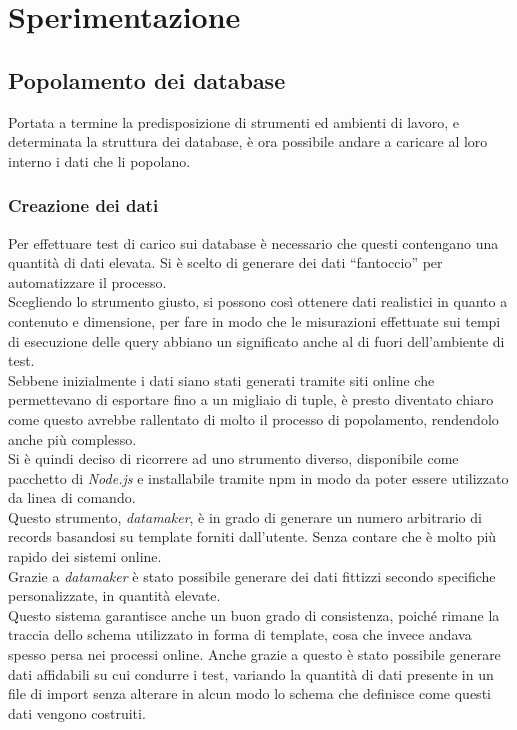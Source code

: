 
\chapter{Sperimentazione}
\label{cap:sperimentazione}
\section{Popolamento dei database}

Portata a termine la predisposizione di strumenti ed ambienti di lavoro, e determinata la struttura dei database, è ora possibile andare a caricare al loro interno i dati che li popolano.\\

\subsection{Creazione dei dati}
Per effettuare test di carico sui database è necessario che questi contengano una quantità di dati elevata. Si è scelto di generare dei dati ``fantoccio'' per automatizzare il processo.\\
Scegliendo lo strumento giusto, si possono così ottenere dati realistici in quanto a contenuto e dimensione, per fare in modo che le misurazioni effettuate sui tempi di esecuzione delle query abbiano un significato anche al di fuori dell'ambiente di test.\\
Sebbene inizialmente i dati siano stati generati tramite siti online che permettevano di esportare fino a un migliaio di tuple, è presto diventato chiaro come questo avrebbe rallentato di molto il processo di popolamento, rendendolo anche più complesso.\\

\noindent Si è quindi deciso di ricorrere ad uno strumento diverso, disponibile come pacchetto di \textit{Node.js} e installabile tramite \gls{npm} in modo da poter essere utilizzato da linea di comando.\\
Questo strumento, \textit{datamaker}, è in grado di generare un numero arbitrario di records basandosi su template forniti dall'utente. Senza contare che è molto più rapido dei sistemi online.\\
Grazie a \textit{datamaker} è stato possibile generare dei dati fittizzi secondo specifiche personalizzate, in quantità elevate.\\
Questo sistema garantisce anche un buon grado di consistenza, poiché rimane la traccia dello schema utilizzato in forma di template, cosa che invece andava spesso persa nei processi online. Anche grazie a questo è stato possibile generare dati affidabili su cui condurre i test, variando la quantità di dati presente in un file di import senza alterare in alcun modo lo schema che definisce come questi dati vengono costruiti.\\


